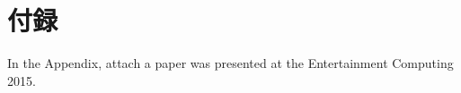 \chapter*{付録}\label{huroku}

\begin{flushleft}
In the Appendix, attach a paper was presented at the Entertainment Computing 2015.
\end{flushleft}

\newpage

\pagestyle{empty}

